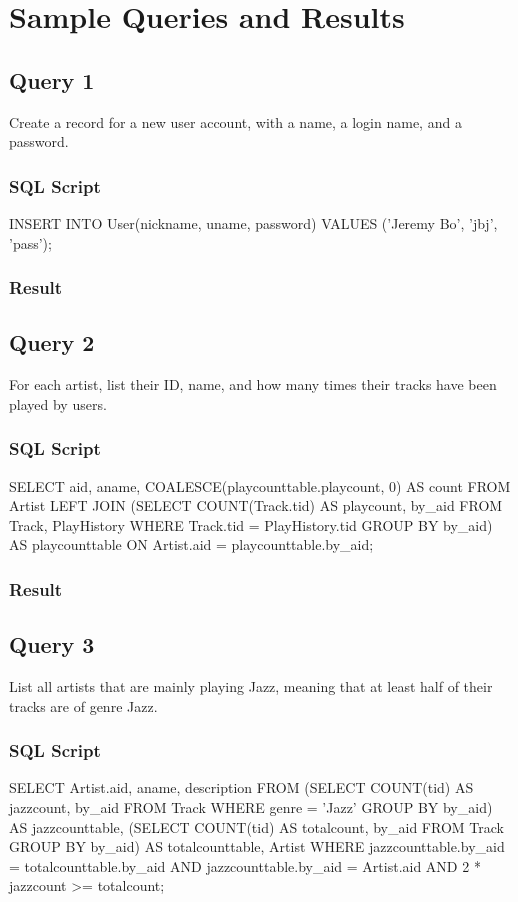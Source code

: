 \documentclass[letterpaper, 12pt]{report}
\begin{document}
	\section{Sample Queries and Results}
	\subsection{Query 1}
	Create a record for a new user account, with a name, a login name, and a password.
	\subsubsection{SQL Script}
	\begin{spverbatim}
		INSERT INTO User(nickname, uname, password) VALUES ('Jeremy Bo', 'jbj', 'pass');
	\end{spverbatim}
	\subsubsection{Result}
	
	\subsection{Query 2}
	For each artist, list their ID, name, and how many times their tracks have been played by users.
	\subsubsection{SQL Script}
	\begin{spverbatim}
		SELECT aid, aname, COALESCE(playcounttable.playcount, 0) AS count 
		FROM Artist LEFT JOIN
		(SELECT COUNT(Track.tid) AS playcount, by_aid 
		FROM Track, PlayHistory
		WHERE Track.tid = PlayHistory.tid
		GROUP BY by_aid) AS playcounttable
		ON Artist.aid = playcounttable.by_aid;
	\end{spverbatim}
	\subsubsection{Result}
	
	\subsection{Query 3}
	List all artists that are mainly playing Jazz, meaning that at least half of their tracks are of genre Jazz.
	\subsubsection{SQL Script}
	\begin{spverbatim}
		SELECT Artist.aid, aname, description FROM
		(SELECT COUNT(tid) AS jazzcount, by_aid
		FROM Track
		WHERE genre = 'Jazz'
		GROUP BY by_aid) AS jazzcounttable,
		(SELECT COUNT(tid) AS totalcount, by_aid
		FROM Track
		GROUP BY by_aid) AS totalcounttable, Artist
		WHERE jazzcounttable.by_aid = totalcounttable.by_aid
		AND jazzcounttable.by_aid = Artist.aid
		AND 2 * jazzcount >= totalcount;
	\end{spverbatim}
\end{document}
